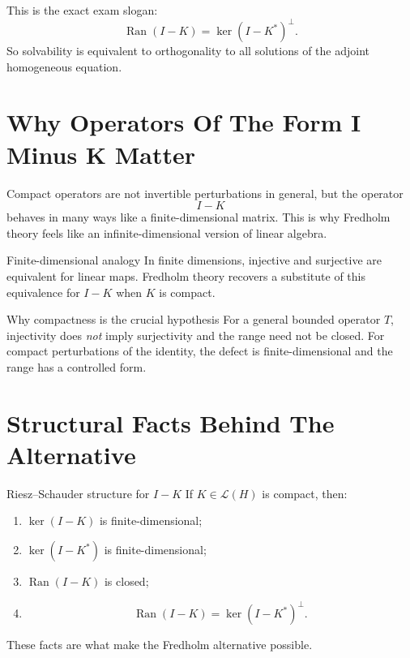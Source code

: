 \documentclass[header={Lecture 9 Exam Study Notes}]{study-note}
\begin{document}
\begin{focusbox}
This is the exact exam slogan:
\[
\operatorname{Ran}(I-K)=\ker(I-K^*)^{\perp}.
\]
So solvability is equivalent to orthogonality to all solutions of the adjoint homogeneous equation.
\end{focusbox}

\section{Why Operators Of The Form I Minus K Matter}

\begin{focusbox}
Compact operators are not invertible perturbations in general, but the operator
\[
I-K
\]
behaves in many ways like a finite-dimensional matrix. This is why Fredholm theory feels like an infinite-dimensional version of linear algebra.
\end{focusbox}

\begin{warningbox}{Finite-dimensional analogy}
In finite dimensions, injective and surjective are equivalent for linear maps. Fredholm theory recovers a substitute of this equivalence for $I-K$ when $K$ is compact.
\end{warningbox}

\begin{exbox}{Why compactness is the crucial hypothesis}
For a general bounded operator $T$, injectivity does \emph{not} imply surjectivity and the range need not be closed. For compact perturbations of the identity, the defect is finite-dimensional and the range has a controlled form.
\end{exbox}

\section{Structural Facts Behind The Alternative}

\begin{thmbox}{Riesz--Schauder structure for $I-K$}
If $K\in\mathcal L(H)$ is compact, then:
\begin{enumerate}
\item $\ker(I-K)$ is finite-dimensional;
\item $\ker(I-K^*)$ is finite-dimensional;
\item $\operatorname{Ran}(I-K)$ is closed;
\item
\[
\operatorname{Ran}(I-K)=\ker(I-K^*)^{\perp}.
\]
\end{enumerate}
These facts are what make the Fredholm alternative possible.
\end{thmbox}
\end{document}
